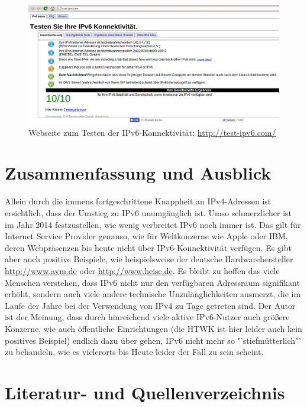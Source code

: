 \documentclass[a4paper,12pt]{scrartcl}
\begin{document}
\begin{figure}[htb]
\begin{center}
 \includegraphics[width=1\hsize]{./images/testipv6.png}
 \end{center}
\caption[Webseite zum Testen der IPv6-Konnektivit\"at: \url{http://test-ipv6.com/}]{\label{testipv6}Webseite zum Testen der IPv6-Konnektivit\"at: \url{http://test-ipv6.com/}}
\end{figure}

\clearpage
\section{Zusammenfassung und Ausblick}
Allein durch die immens fortgeschrittene Knappheit an IPv4-Adressen ist ersichtlich, dass der Umstieg zu IPv6 unumg\"anglich ist. Umso schmerzlicher ist im Jahr 2014 festzustellen, wie wenig verbreitet IPv6 noch immer ist. Das gilt f\"ur Internet Service Provider genauso, wie f\"ur Weltkonzerne wie Apple oder IBM, deren Webpräsenzen bis heute nicht über IPv6-Konnektivit\"at verf\"ugen. Es gibt aber auch positive Beispiele, wie beispielsweise der deutsche Hardwarehersteller \url{http://www.avm.de} oder \url{http://www.heise.de}. Es bleibt zu hoffen das viele Menschen verstehen, dass IPv6 nicht nur den verf\"ugbaren Adressraum signifikant erh\"oht, sondern auch viele andere technische Unzul\"anglichkeiten ausmerzt, die im Laufe der Jahre bei der Verwendung von IPv4 zu Tage getreten sind. Der Autor ist der Meinung, dass durch hinreichend viele aktive IPv6-Nutzer auch gr\"o{\ss}ere Konzerne, wie auch \"offentliche Einrichtungen (die HTWK ist hier leider auch kein positives Beispiel) endlich dazu \"uber gehen, IPv6 nicht mehr so "'stiefm\"utterlich"` zu behandeln, wie es vielerorts bis Heute leider der Fall zu sein scheint. 


\clearpage
\section{Literatur- und Quellenverzeichnis}
\end{document}
